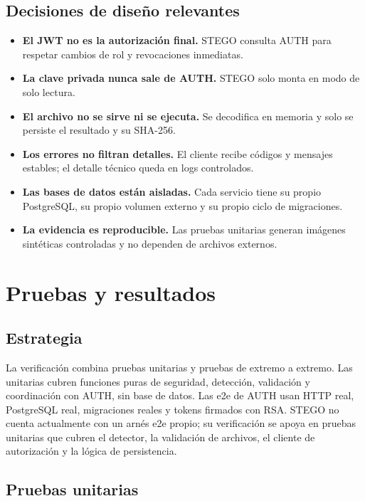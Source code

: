 \documentclass[11pt,a4paper]{article}
\newcommand{\code}[1]{\texttt{\detokenize{#1}}}
\begin{document}
\subsection{Decisiones de diseño relevantes}

\begin{itemize}[leftmargin=1.4em]
  \item \textbf{El JWT no es la autorización final.} STEGO consulta AUTH para respetar cambios de rol y revocaciones inmediatas.
  \item \textbf{La clave privada nunca sale de AUTH.} STEGO solo monta \code{public.pem} en modo de solo lectura.
  \item \textbf{El archivo no se sirve ni se ejecuta.} Se decodifica en memoria y solo se persiste el resultado y su SHA-256.
  \item \textbf{Los errores no filtran detalles.} El cliente recibe códigos y mensajes estables; el detalle técnico queda en logs controlados.
  \item \textbf{Las bases de datos están aisladas.} Cada servicio tiene su propio PostgreSQL, su propio volumen externo y su propio ciclo de migraciones.
  \item \textbf{La evidencia es reproducible.} Las pruebas unitarias generan imágenes sintéticas controladas y no dependen de archivos externos.
\end{itemize}

\section{Pruebas y resultados}

\subsection{Estrategia}

La verificación combina pruebas unitarias y pruebas de extremo a extremo. Las
unitarias cubren funciones puras de seguridad, detección, validación y coordinación
con AUTH, sin base de datos. Las e2e de AUTH usan HTTP real, PostgreSQL real,
migraciones reales y tokens firmados con RSA. STEGO no cuenta actualmente con un
arnés e2e propio; su verificación se apoya en pruebas unitarias que cubren el
detector, la validación de archivos, el cliente de autorización y la lógica de
persistencia.

\subsection{Pruebas unitarias}
\end{document}
